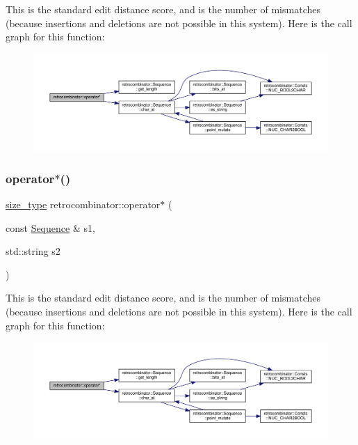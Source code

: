 This is the standard edit distance score, and is the number of mismatches (because insertions and deletions are not possible in this system). Here is the call graph for this function\+:
\nopagebreak
\begin{figure}[H]
\begin{center}
\leavevmode
\includegraphics[width=350pt]{namespaceretrocombinator_a2d223ac406c9e02cf5687c709ad5da9d_cgraph}
\end{center}
\end{figure}
\mbox{\label{namespaceretrocombinator_a33fa303439100639ad5432a19b8c01d4}} 
\subsubsection{\texorpdfstring{operator$\ast$()}{operator*()}\hspace{0.1cm}{\footnotesize\ttfamily [2/2]}}
{\footnotesize\ttfamily \hyperlink{namespaceretrocombinator_a8e1541b50cee66a791df4c437ccbb385}{size\+\_\+type} retrocombinator\+::operator$\ast$ (\begin{DoxyParamCaption}\item[{const \hyperlink{classretrocombinator_1_1Sequence}{Sequence} \&}]{s1,  }\item[{std\+::string}]{s2 }\end{DoxyParamCaption})}

This is the standard edit distance score, and is the number of mismatches (because insertions and deletions are not possible in this system). Here is the call graph for this function\+:
\nopagebreak
\begin{figure}[H]
\begin{center}
\leavevmode
\includegraphics[width=350pt]{namespaceretrocombinator_a33fa303439100639ad5432a19b8c01d4_cgraph}
\end{center}
\end{figure}
\mbox{\label{namespaceretrocombinator_a3d34bdb68843d370ccb2374dfb8e9eac}} 
